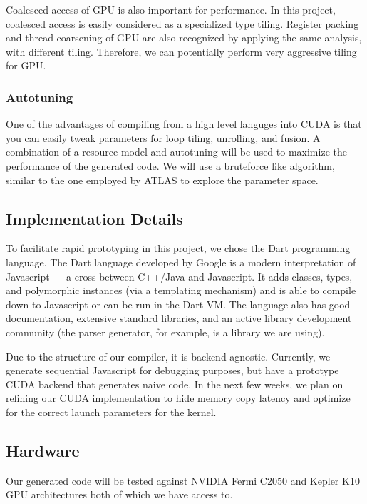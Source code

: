 Coalesced access of GPU is also important for performance. In this
project, coalesced access is easily considered as a specialized type
tiling. Register packing and thread coarsening of GPU are also
recognized by applying the same analysis, with different tiling.
Therefore, we can potentially perform very aggressive tiling for GPU.

\subsubsection{Autotuning}\label{autotuning}

One of the advantages of compiling from a high level languges into CUDA
is that you can easily tweak parameters for loop tiling, unrolling, and
fusion. A combination of a resource model and autotuning will be used to
maximize the performance of the generated code. We will use a bruteforce
like algorithm, similar to the one employed by ATLAS to explore the
parameter space.

\subsection{Implementation Details}\label{implementation-details}

To facilitate rapid prototyping in this project, we chose the Dart
programming language. The Dart language developed by Google is a modern
interpretation of Javascript --- a cross between C++/Java and
Javascript. It adds classes, types, and polymorphic instances (via a
templating mechanism) and is able to compile down to Javascript or can
be run in the Dart VM. The language also has good documentation,
extensive standard libraries, and an active library development
community (the parser generator, for example, is a library we are
using).

Due to the structure of our compiler, it is backend-agnostic. Currently,
we generate sequential Javascript for debugging purposes, but have a
prototype CUDA backend that generates naive code. In the next few weeks,
we plan on refining our CUDA implementation to hide memory copy latency
and optimize for the correct launch parameters for the kernel.

\subsection{Hardware}\label{hardware}

Our generated code will be tested against NVIDIA Fermi C2050 and Kepler
K10 GPU architectures both of which we have access to.

